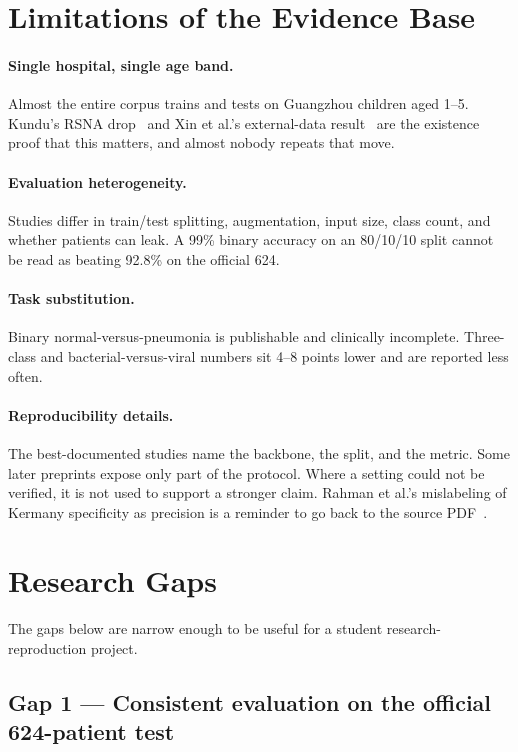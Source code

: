 \documentclass[11pt,a4paper]{article}
\begin{document}
\section{Limitations of the Evidence Base}
\paragraph{Single hospital, single age band.}
Almost the entire corpus trains and tests on Guangzhou children aged 1--5. Kundu's RSNA drop~\cite{kundu2021} and Xin et al.'s external-data result~\cite{xin2021} are the existence proof that this matters, and almost nobody repeats that move.

\paragraph{Evaluation heterogeneity.}
Studies differ in train/test splitting, augmentation, input size, class count, and whether patients can leak. A 99\% binary accuracy on an 80/10/10 split cannot be read as beating 92.8\% on the official 624.

\paragraph{Task substitution.}
Binary normal-versus-pneumonia is publishable and clinically incomplete. Three-class and bacterial-versus-viral numbers sit 4--8 points lower and are reported less often.

\paragraph{Reproducibility details.}
The best-documented studies name the backbone, the split, and the metric. Some later preprints expose only part of the protocol. Where a setting could not be verified, it is not used to support a stronger claim. Rahman et al.'s mislabeling of Kermany specificity as precision is a reminder to go back to the source PDF~\cite{rahman2020,kermany2018}.

\section{Research Gaps}
The gaps below are narrow enough to be useful for a student research-reproduction project.

\subsection{Gap 1 --- Consistent evaluation on the official 624-patient test}
\end{document}
